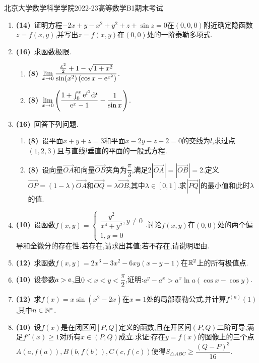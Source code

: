 \documentclass{ctexart}
\begin{document}
\pagestyle{empty}

\begin{center}\Large
    北京大学数学科学学院2022-23高等数学B1期末考试
\end{center}
\begin{enumerate}[leftmargin=*,label=\textbf{\arabic*.}]
    \item \textbf{(14)}\ 证明方程$-2x+y-x^2+y^2+z+\sin z=0$在$(0,0,0)$附近确定隐函数$z=f(x,y)$,并写出$z=f(x,y)$在$(0,0)$处的一阶泰勒多项式.
    \item \textbf{(16)}\ 求函数极限.
        \begin{enumerate}[label=\textbf{(\arabic*)},leftmargin=*]
            \item \textbf{(8)}\ $\displaystyle\lim_{x\to0}\dfrac{\frac{x^2}{2}+1-\sqrt{1+x^2}}{\sin(x^2)\left(\cos x-\mathrm{e}^{x^2}\right)}$.
            \item \textbf{(8)}\ $\displaystyle\lim_{x\to0}\left(\dfrac{1+\int_0^x\mathrm{e}^{t^2}\mathrm{d} t}{\mathrm{e}^x-1}-\dfrac{1}{\sin x}\right)$.
        \end{enumerate}
    \item \textbf{(16)}\ 回答下列问题.
        \begin{enumerate}[label=\textbf{(\arabic*)},leftmargin=*]
            \item \textbf{(8)}\ 设平面$x+y+z=3$和平面$x-2y-z+2=0$的交线为$l$,求过点$(1,2,3)$且与直线$l$垂直的平面的一般式方程.
            \item \textbf{(8)}\ 设向量$\overrightarrow{OA}$和向量$\overrightarrow{OB}$夹角为$\dfrac\pi3$,满足$2\left|\overrightarrow{OA}\right|=\left|\overrightarrow{OB}\right|=2$.定义$\overrightarrow{OP}=(1-\lambda)\overrightarrow{OA}$和$\overrightarrow{OQ}=\lambda\overrightarrow{OB}$,其中$\lambda\in[0,1]$.求$\left|\overrightarrow{PQ}\right|$的最小值和此时$\lambda$的值.
        \end{enumerate}
    \item \textbf{(10)}\ 设函数$\displaystyle f(x,y)=\left\{\begin{array}{l}
        \dfrac{y^2}{x^4+y^2},y\neq0\\
        1,y=0
    \end{array}\right.$.讨论$f(x,y)$在$(0,0)$处的两个偏导和全微分的存在性.若存在,请求出其值;若不存在,请说明理由.
    \item \textbf{(12)}\ 求函数$f(x,y)=2x^3-3x^2-6xy(x-y-1)$在$\mathbb{R}^2$上的所有极值点.
    \item \textbf{(10)}\ 设参数$a>\mathrm{e}$,且$0<x<y<\dfrac\pi2$,证明:$a^y-a^x>a^x\ln a(\cos x-\cos y)$.
    \item \textbf{(12)}\ 求$f(x)=x\sin(x^2-2x)$在$x=1$处的局部泰勒公式,并计算$f^{(n)}(1)$,其中$n\in\mathbb{N}^*$.
    \item \textbf{(10)}\ 设$f(x)$是在闭区间$[P,Q]$定义的函数,且在开区间$(P,Q)$二阶可导,满足$f''(x)\geqslant1$对所有$x\in(P,Q)$成立.求证:存在$y=f(x)$的图像上的三个点%
    $A(a,f(a)),B(b,f(b)),C(c,f(c))$使得$S_{\triangle ABC}\geqslant\dfrac{(Q-P)^3}{16}$.
\end{enumerate}
\end{document}
